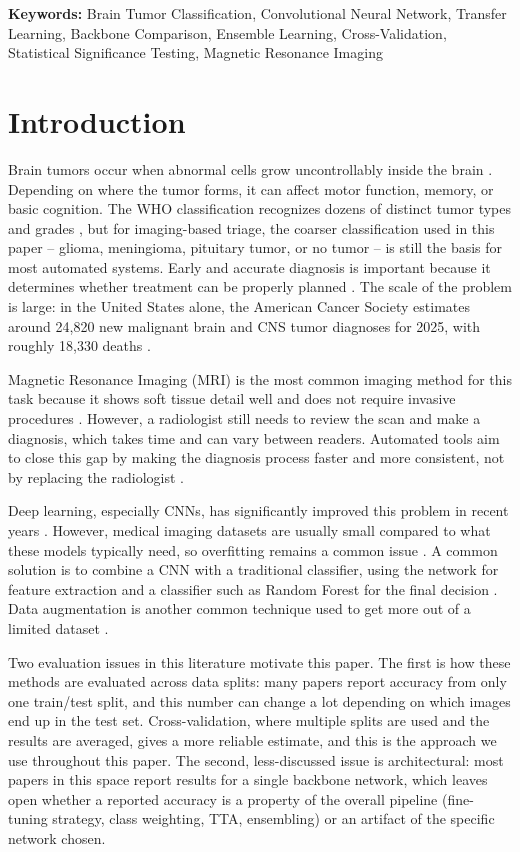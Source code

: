 \documentclass[11pt]{article}
\begin{document}
\noindent\textbf{Keywords:} Brain Tumor Classification, Convolutional Neural Network, Transfer Learning, Backbone Comparison, Ensemble Learning, Cross-Validation, Statistical Significance Testing, Magnetic Resonance Imaging

\section{Introduction}
\label{sec:intro}

Brain tumors occur when abnormal cells grow uncontrollably inside the brain \cite{r16}. Depending on where the tumor forms, it can affect motor function, memory, or basic cognition. The WHO classification recognizes dozens of distinct tumor types and grades \cite{louis2021who}, but for imaging-based triage, the coarser classification used in this paper -- glioma, meningioma, pituitary tumor, or no tumor -- is still the basis for most automated systems. Early and accurate diagnosis is important because it determines whether treatment can be properly planned \cite{r16}. The scale of the problem is large: in the United States alone, the American Cancer Society estimates around 24,820 new malignant brain and CNS tumor diagnoses for 2025, with roughly 18,330 deaths \cite{r4}.

Magnetic Resonance Imaging (MRI) is the most common imaging method for this task because it shows soft tissue detail well and does not require invasive procedures \cite{r16}. However, a radiologist still needs to review the scan and make a diagnosis, which takes time and can vary between readers. Automated tools aim to close this gap by making the diagnosis process faster and more consistent, not by replacing the radiologist \cite{r19}.

Deep learning, especially CNNs, has significantly improved this problem in recent years \cite{r16, r17}. However, medical imaging datasets are usually small compared to what these models typically need, so overfitting remains a common issue \cite{r19}. A common solution is to combine a CNN with a traditional classifier, using the network for feature extraction and a classifier such as Random Forest for the final decision \cite{r18, r20}. Data augmentation is another common technique used to get more out of a limited dataset \cite{r20}.

Two evaluation issues in this literature motivate this paper. The first is how these methods are evaluated across data splits: many papers report accuracy from only one train/test split, and this number can change a lot depending on which images end up in the test set. Cross-validation, where multiple splits are used and the results are averaged, gives a more reliable estimate, and this is the approach we use throughout this paper. The second, less-discussed issue is architectural: most papers in this space report results for a single backbone network, which leaves open whether a reported accuracy is a property of the overall pipeline (fine-tuning strategy, class weighting, TTA, ensembling) or an artifact of the specific network chosen.
\end{document}
